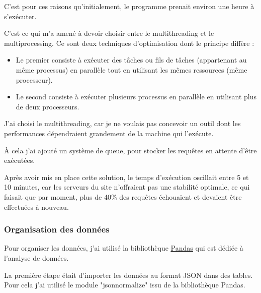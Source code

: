 C'est pour ces raisons qu'initialement, le programme prenait environ une heure à s'exécuter.

C'est ce qui m'a amené à devoir choisir entre le multithreading et le multiprocessing. Ce sont deux techniques d'optimisation dont le principe diffère :
\begin{itemize}
\item Le premier consiste à exécuter des tâches ou fils de tâches (appartenant au même processus) en parallèle tout en utilisant les mêmes ressources (même processeur).
\item Le second consiste à exécuter plusieurs processus en parallèle en utilisant plus de deux processeurs.
\end{itemize}

J'ai choisi le multithreading, car je ne voulais pas concevoir un outil dont les performances dépendraient grandement de la machine qui l'exécute.

À cela j'ai ajouté un système de queue, pour stocker les requêtes en attente d'être exécutées.

Après avoir mis en place cette solution, le temps d'exécution oscillait entre 5 et 10 minutes, car les serveurs du site n'offraient pas une stabilité optimale, ce qui faisait que par moment, plus de 40\% des requêtes échouaient et devaient être effectuées à nouveau.

\subsubsection{Organisation des données}

Pour organiser les données, j'ai utilisé la bibliothèque \underline{\href{https://pandas.pydata.org}{Pandas}} qui est dédiée à l'analyse de données.

La première étape était d'importer les données au format JSON dans des tables. Pour cela j'ai utilisé le module "jsonnormalize" issu de la bibliothèque Pandas.

